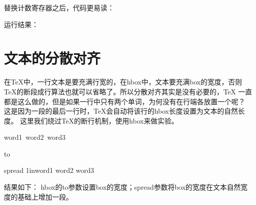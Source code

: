 \documentclass{article}
\begin{document}
  替换计数寄存器之后，代码更易读：


  运行结果：

  \section[文本的分散对齐]{文本的分散对齐}
  在\TeX{}中，一行文本是要充满行宽的，在hbox中，文本要充满box的宽度，否则
  \TeX{}的断段成行算法也就可以省略了。所以分散对齐其实是没有必要的，\TeX{}
  一直都是这么做的，但是如果一行中只有两个单词，为何没有在行端各放置一个呢？
  这是因为一段的最后一行时，\TeX{}会自动将该行的\bs hbox长度设置为文本的自然长度。
  这里我们绕过\TeX{}的断行机制，使用\bs hbox来做实验。\par
  \begin{latexcode}
\hbox{word1 word2 word3}\par
\hbox to \par
\hbox spread 1in{word1 word2 word3}
  \end{latexcode}

  结果如下：
  \bs hbox的to参数设置box的宽度；spread参数将box的宽度在文本自然宽度的基础上增加一段。
\end{document}
